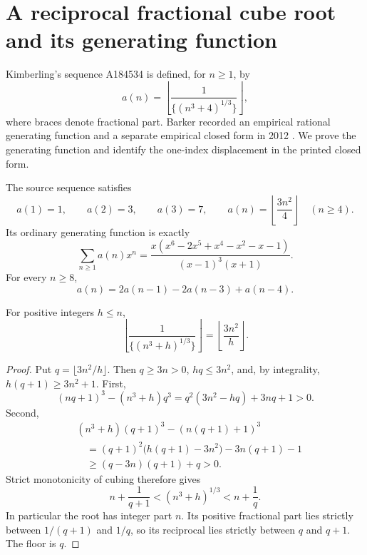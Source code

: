 \section{A reciprocal fractional cube root and its generating function}

Kimberling's sequence A184534 is defined, for $n\ge1$, by
\[
 a(n)=\left\lfloor\frac1{\{(n^3+4)^{1/3}\}}\right\rfloor,
\]
where braces denote fractional part. Barker recorded an empirical rational
generating function and a separate empirical closed form in 2012
\cite{oeis184534}. We prove the generating function and identify the
one-index displacement in the printed closed form.

\begin{theorem}
The source sequence satisfies
\[
 a(1)=1,\qquad a(2)=3,\qquad a(3)=7,\qquad
 a(n)=\left\lfloor\frac{3n^2}{4}\right\rfloor\quad(n\ge4).
\]
Its ordinary generating function is exactly
\begin{equation}\label{a184534:gf}
 \sum_{n\ge1}a(n)x^n=
 \frac{x(x^6-2x^5+x^4-x^2-x-1)}{(x-1)^3(x+1)}.
\end{equation}
For every $n\ge8$,
\[
 a(n)=2a(n-1)-2a(n-3)+a(n-4).
\]
\end{theorem}

\begin{lemma}\label{a184534:general}
For positive integers $h\le n$,
\[
 \left\lfloor\frac1{\{(n^3+h)^{1/3}\}}\right\rfloor
 =\left\lfloor\frac{3n^2}{h}\right\rfloor.
\]
\end{lemma}
\begin{proof}
Put $q=\lfloor3n^2/h\rfloor$. Then $q\ge3n>0$,
$hq\le3n^2$, and, by integrality, $h(q+1)\ge3n^2+1$.
First,
\[
 (nq+1)^3-(n^3+h)q^3
 =q^2(3n^2-hq)+3nq+1>0.
\]
Second,
\begin{align*}
 &(n^3+h)(q+1)^3-(n(q+1)+1)^3\\
 &\quad=(q+1)^2\bigl(h(q+1)-3n^2\bigr)-3n(q+1)-1\\
 &\quad\ge(q-3n)(q+1)+q>0.
\end{align*}
Strict monotonicity of cubing therefore gives
\[
 n+\frac1{q+1}<(n^3+h)^{1/3}<n+\frac1q.
\]
In particular the root has integer part $n$. Its positive fractional
part lies strictly between $1/(q+1)$ and $1/q$, so its reciprocal lies
strictly between $q$ and $q+1$. The floor is $q$.
\end{proof}

